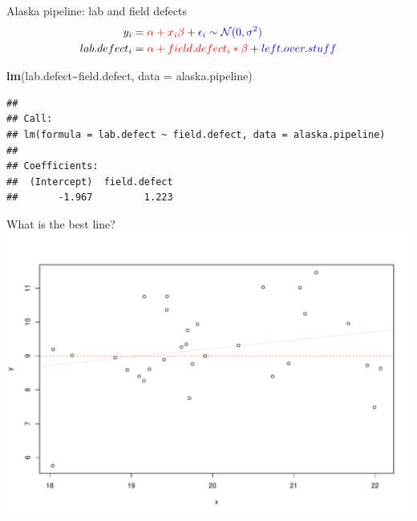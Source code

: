 \documentclass[
  ignorenonframetext,
]{beamer}
\newenvironment{Shaded}{\begin{snugshade}}{\end{snugshade}}
\newcommand{\AttributeTok}[1]{\textcolor[rgb]{0.13,0.29,0.53}{#1}}
\newcommand{\FunctionTok}[1]{\textcolor[rgb]{0.13,0.29,0.53}{\textbf{#1}}}
\newcommand{\NormalTok}[1]{#1}
\newcommand{\SpecialCharTok}[1]{\textcolor[rgb]{0.81,0.36,0.00}{\textbf{#1}}}
\begin{document}
\begin{frame}[fragile]{Alaska pipeline: lab and field defects}
\label{alaska-pipeline-lab-and-field-defects}
\begin{equation}
\begin{aligned}
y_i &= \textcolor{red}{\alpha + x_i\beta} + \textcolor{blue}{\epsilon_i\sim \mathcal{N}(0,\sigma^2)}\\
lab.defect_i &= \textcolor{red}{\alpha + field.defect_i *\beta} + \textcolor{blue}{left.over.stuff}
\end{aligned}
\end{equation}

\pause
\small

\begin{codebox}

\begin{Shaded}
\begin{Highlighting}[]
\FunctionTok{lm}\NormalTok{(lab.defect}\SpecialCharTok{\textasciitilde{}}\NormalTok{field.defect, }\AttributeTok{data =}\NormalTok{ alaska.pipeline)}
\end{Highlighting}
\end{Shaded}

\end{codebox}

\begin{codebox}

\begin{verbatim}
## 
## Call:
## lm(formula = lab.defect ~ field.defect, data = alaska.pipeline)
## 
## Coefficients:
##  (Intercept)  field.defect  
##       -1.967         1.223
\end{verbatim}

\end{codebox}
\end{frame}

\begin{frame}{What is the best line?}
\label{what-is-the-best-line}
\includegraphics{IntroLM_files/figure-beamer/norm2-1.pdf}
\end{frame}
\end{document}
